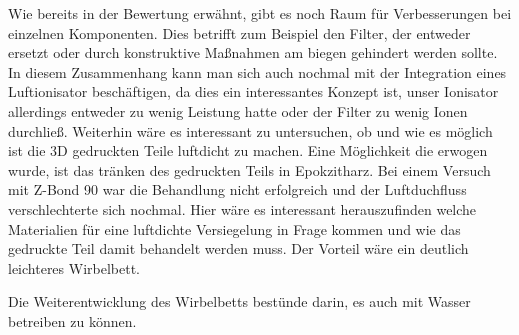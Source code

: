 Wie bereits in der Bewertung erwähnt, gibt es noch Raum für Verbesserungen bei einzelnen Komponenten. Dies betrifft zum Beispiel den Filter, der entweder ersetzt oder durch konstruktive Maßnahmen am biegen gehindert werden sollte. In diesem Zusammenhang kann man sich auch nochmal mit der Integration eines Luftionisator beschäftigen, da dies ein interessantes Konzept ist, unser Ionisator allerdings entweder zu wenig Leistung hatte oder der Filter zu wenig Ionen durchließ.
Weiterhin wäre es interessant zu untersuchen, ob und wie es möglich ist die 3D gedruckten Teile luftdicht zu machen. Eine Möglichkeit die erwogen wurde, ist das tränken des gedruckten Teils in Epokzitharz. Bei einem Versuch mit Z-Bond 90 war die Behandlung nicht erfolgreich und der Luftduchfluss verschlechterte sich nochmal. Hier wäre es interessant herauszufinden welche Materialien für eine luftdichte Versiegelung in Frage kommen und wie das gedruckte Teil damit behandelt werden muss. Der Vorteil wäre ein deutlich leichteres Wirbelbett.

Die Weiterentwicklung des Wirbelbetts bestünde darin, es auch mit Wasser betreiben zu können.




